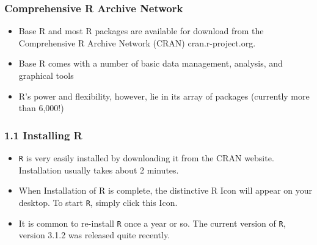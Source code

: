 \documentclass{beamer}
\begin{document}
 	
 	\begin{frame}
 		\frametitle{Comprehensive R Archive Network}
 		\begin{itemize}
 			\item Base R and most R packages are available for download from the Comprehensive R Archive Network
 			(CRAN) cran.r-project.org. 
 			\item Base R comes with a number of basic data management,
 			analysis, and graphical tools 
 			\item R’s power and flexibility, however, lie in its array of packages
 			(currently more than 6,000!)
 		\end{itemize}
 		
 	\end{frame}
 	\begin{frame}
 		\frametitle{1.1 Installing R}
 		\begin{itemize}
 			\item \texttt{R} is very easily installed by downloading it from the CRAN website. Installation usually takes
 			about 2 minutes. 
 			\item When Installation of R is complete, the distinctive R Icon will appear on your
 			desktop. To start \texttt{R}, simply click this Icon. 
 			\item It is common to re-install \texttt{R} once a year or so. The
 			current version of \texttt{R}, version 3.1.2 was released quite recently.
 		\end{itemize}
 		
 	\end{frame}
 	
\end{document}

